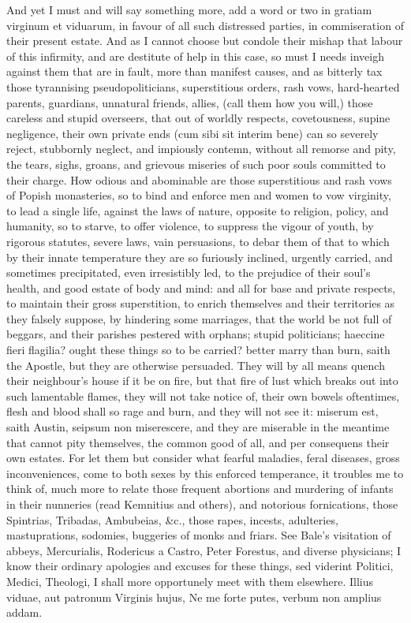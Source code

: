 {And yet I must and will say something more, add a word or two in
gratiam virginum et viduarum, in favour of all such distressed parties,
in commiseration of their present estate. And as I cannot choose but
condole their mishap that labour of this infirmity, and are destitute
of help in this case, so must I needs inveigh against them that are in
fault, more than manifest causes, and as bitterly tax those tyrannising
pseudopoliticians, superstitious orders, rash vows, hard-hearted
parents, guardians, unnatural friends, allies, (call them how you
will,) those careless and stupid overseers, that out of worldly
respects, covetousness, supine negligence, their own private ends (cum
sibi sit interim bene) can so severely reject, stubbornly neglect, and
impiously contemn, without all remorse and pity, the tears, sighs,
groans, and grievous miseries of such poor souls committed to their
charge. How odious and abominable are those superstitious and rash vows
of Popish monasteries, so to bind and enforce men and women to vow
virginity, to lead a single life, against the laws of nature, opposite
to religion, policy, and humanity, so to starve, to offer violence, to
suppress the vigour of youth, by rigorous statutes, severe laws, vain
persuasions, to debar them of that to which by their innate temperature
they are so furiously inclined, urgently carried, and sometimes
precipitated, even irresistibly led, to the prejudice of their soul's
health, and good estate of body and mind: and all for base and private
respects, to maintain their gross superstition, to enrich themselves
and their territories as they falsely suppose, by hindering some
marriages, that the world be not full of beggars, and their parishes
pestered with orphans; stupid politicians; haeccine fieri flagilia?
ought these things so to be carried? better marry than burn, saith the
Apostle, but they are otherwise persuaded. They will by all means
quench their neighbour's house if it be on fire, but that fire of lust
which breaks out into such lamentable flames, they will not take notice
of, their own bowels oftentimes, flesh and blood shall so rage and
burn, and they will not see it: miserum est, saith Austin, seipsum non
miserescere, and they are miserable in the meantime that cannot pity
themselves, the common good of all, and per consequens their own
estates. For let them but consider what fearful maladies, feral
diseases, gross inconveniences, come to both sexes by this enforced
temperance, it troubles me to think of, much more to relate those
frequent abortions and murdering of infants in their nunneries (read
Kemnitius and others), and notorious fornications, those
Spintrias, Tribadas, Ambubeias, \&c., those rapes, incests, adulteries,
mastuprations, sodomies, buggeries of monks and friars. See Bale's
visitation of abbeys, Mercurialis, Rodericus a Castro, Peter
Forestus, and diverse physicians; I know their ordinary apologies and
excuses for these things, sed viderint Politici, Medici, Theologi, I
shall more opportunely meet with them elsewhere.
Illius viduae, aut patronum Virginis hujus,
Ne me forte putes, verbum non amplius addam.


}
